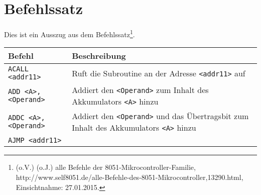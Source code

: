 
\chapter{Befehlssatz}\label{befehlssatz}

Dies ist ein Ausszug aus dem Befehlssatz\footnote{(o.V.) (o.J.) alle Befehle der
  8051-Mikrocontroller-Familie,
  http://www.self8051.de/alle-Befehle-des-8051-Mikrocontroller,13290.html, Einsichtnahme:
  27.01.2015.}.

\begin{longtable}[c]{@{}ll@{}}
\toprule
\begin{minipage}[b]{0.25\columnwidth}\raggedright\strut
\textbf{Befehl}
\strut\end{minipage} & \begin{minipage}[b]{0.69\columnwidth}\raggedright\strut
\textbf{Beschreibung}
\strut\end{minipage}\tabularnewline
\midrule
\endhead
\begin{minipage}[t]{0.25\columnwidth}\raggedright\strut
\texttt{ACALL <addr11>}
\strut\end{minipage} & \begin{minipage}[t]{0.69\columnwidth}\raggedright\strut
Ruft die Subroutine an der Adresse \texttt{<addr11>} auf
\strut\end{minipage}\tabularnewline
\begin{minipage}[t]{0.25\columnwidth}\raggedright\strut
\texttt{ADD <A>,<Operand>}
\strut\end{minipage} & \begin{minipage}[t]{0.69\columnwidth}\raggedright\strut
Addiert den \texttt{<Operand>} zum Inhalt des Akkumulators \texttt{<A>} hinzu
\strut\end{minipage}\tabularnewline
\begin{minipage}[t]{0.25\columnwidth}\raggedright\strut
\texttt{ADDC <A>,<Operand>}
\strut\end{minipage} & \begin{minipage}[t]{0.69\columnwidth}\raggedright\strut
Addiert den \texttt{<Operand>} und das Übertragsbit zum Inhalt des Akkumulators \texttt{<A>}
hinzu
\strut\end{minipage}\tabularnewline
\begin{minipage}[t]{0.25\columnwidth}\raggedright\strut
\texttt{AJMP <addr11>}
\strut\end{minipage} & \begin{minipage}[t]{0.69\columnwidth}\raggedright\strut

\end{minipage}
\end{longtable}
